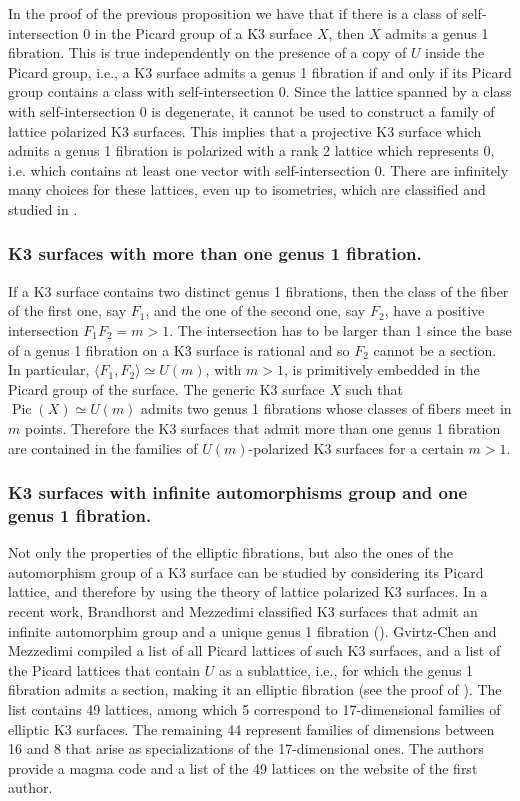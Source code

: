 \documentclass{amsart}
\theoremstyle{definition}
\numberwithin{equation}{section}
\DeclareMathOperator{\Pic}{Pic}
\begin{document}
    In the proof of the previous proposition we have that if there is a class of self-intersection 0 in the Picard group of a K3 surface $X$, then $X$ admits a genus 1 fibration. This is true independently on the presence of a copy of $U$ inside the Picard group, i.e., a K3 surface admits a genus 1 fibration if and only if its Picard group contains a class with self-intersection 0. Since the lattice spanned by a class with self-intersection 0 is degenerate, it cannot be used to construct a family of lattice polarized K3 surfaces. This implies that a projective K3 surface which admits a genus 1 fibration is polarized with a rank 2 lattice which represents 0, i.e. which contains at least one vector with self-intersection 0. There are infinitely many choices for these lattices, even up to isometries, which are classified and studied in \cite{vanGeemen}.

\subsubsection{K3 surfaces with more than one genus 1 fibration.}\label{subsubsec: K3 with two genus 1 fibration} If a K3 surface contains two distinct genus 1 fibrations, then the class of the fiber of the first one, say $F_1$, and the one of the second one, say $F_2$, have a positive intersection $F_1F_2=m>1$. The intersection has to be larger than 1 since the base of a genus 1 fibration on a K3 surface is rational and so $F_2$ cannot be a section. In particular, $\langle F_1,F_2\rangle\simeq U(m)$, with $m>1$, is primitively embedded in the Picard group of the surface. The generic K3 surface $X$ such that $\Pic(X)\simeq U(m)$ admits two genus 1 fibrations whose classes of fibers meet in $m$ points. 
Therefore the K3 surfaces that admit more than one genus 1 fibration are contained in the families of $U(m)$-polarized K3 surfaces for a certain $m>1$.

\subsubsection{K3 surfaces with infinite automorphisms group and one genus 1 fibration.} Not only the properties of the elliptic fibrations, but also the ones of the automorphism group of a K3 surface can be studied by considering its Picard lattice, and therefore by using the theory of lattice polarized K3 surfaces.  In a recent work, Brandhorst and Mezzedimi classified K3 surfaces that admit an infinite automorphim group and a unique genus 1 fibration (\cite[Theorem 5.2]{BM}). Gvirtz-Chen and Mezzedimi compiled a list of all Picard lattices of such K3 surfaces, and a list of the Picard lattices that contain $U$ as a sublattice, i.e., for which the genus 1 fibration admits a section, making it an elliptic fibration (see the proof of \cite[Theorem 4.5]{GM}). The list contains 49 lattices, among which 5 correspond to 17-dimensional families of elliptic K3 surfaces. The remaining 44 represent families of dimensions between 16 and 8 that arise as specializations of the 17-dimensional ones. The authors provide a magma code and a list of the 49 lattices on the website of the first author.
\end{document}
